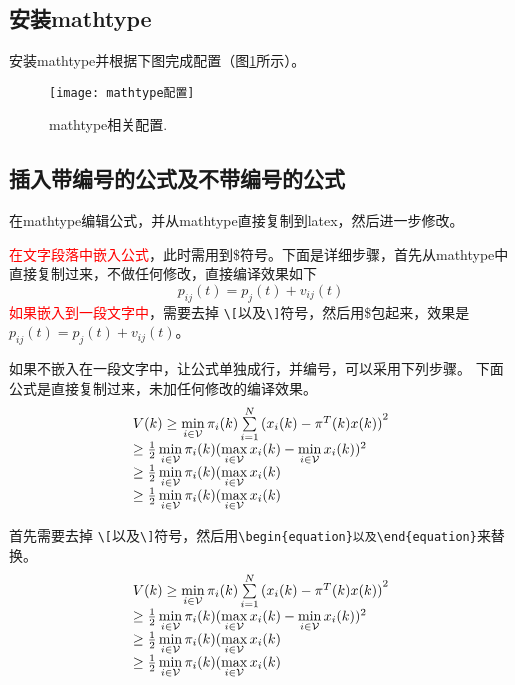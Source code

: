 \documentclass[master]{hdu-thesis}
\begin{document}
\subsection{安装mathtype}
安装mathtype并根据下图完成配置（图\ref{fig_mathtype1}所示）。
 \begin{figure}[!htb]
  \centering
  \texttt{[image: mathtype配置]}
  \caption{mathtype相关配置.}
  \label{fig_mathtype1}
\end{figure}

\subsection{插入带编号的公式及不带编号的公式}
在mathtype编辑公式，并从mathtype直接复制到latex，然后进一步修改。

\textcolor{red}{在文字段落中嵌入公式}，此时需用到\$符号。下面是详细步骤，首先从mathtype中直接复制过来，不做任何修改，直接编译效果如下
\[{p_{ij}}(t) = {p_j}(t) + {v_{ij}}(t)\]
\textcolor{red}{如果嵌入到一段文字中}，需要去掉 \verb|\[|以及\verb|\]|符号，然后用\$包起来，效果是${p_{ij}}(t) = {p_j}(t) + {v_{ij}}(t)$。

如果不嵌入在一段文字中，让公式单独成行，并编号，可以采用下列步骤。
下面公式是直接复制过来，未加任何修改的编译效果。
\[\begin{array}{l}
V(k) \ge \mathop {\min }\limits_{i \in {\cal V}} {\pi _i}(k)\sum\limits_{i = 1}^N {{{({x_i}(k) - {\pi ^T}(k)x(k))}^2}} \\
 \ge \frac{1}{2}\mathop {\min }\limits_{i \in {\cal V}} {\pi _i}(k){(\mathop {\max }\limits_{i \in {\cal V}} {x_i}(k) - \mathop {\min }\limits_{i \in {\cal V}} {x_i}(k))^2}\\
 \ge \frac{1}{2}\mathop {\min }\limits_{i \in {\cal V}} {\pi _i}(k)(\mathop {\max }\limits_{i \in {\cal V}} {x_i}(k)\\
 \ge \frac{1}{2}\mathop {\min }\limits_{i \in {\cal V}} {\pi _i}(k)(\mathop {\max }\limits_{i \in {\cal V}} {x_i}(k)
\end{array}\]

首先需要去掉 \verb|\[|以及\verb|\]|符号，然后用\verb+\begin{equation}以及\end{equation}+来替换。
\begin{equation}\label{system1}
  \begin{array}{l}
V(k) \ge \mathop {\min }\limits_{i \in {\cal V}} {\pi _i}(k)\sum\limits_{i = 1}^N {{{({x_i}(k) - {\pi ^T}(k)x(k))}^2}} \\
 \ge \frac{1}{2}\mathop {\min }\limits_{i \in {\cal V}} {\pi _i}(k){(\mathop {\max }\limits_{i \in {\cal V}} {x_i}(k) - \mathop {\min }\limits_{i \in {\cal V}} {x_i}(k))^2}\\
 \ge \frac{1}{2}\mathop {\min }\limits_{i \in {\cal V}} {\pi _i}(k)(\mathop {\max }\limits_{i \in {\cal V}} {x_i}(k)\\
 \ge \frac{1}{2}\mathop {\min }\limits_{i \in {\cal V}} {\pi _i}(k)(\mathop {\max }\limits_{i \in {\cal V}} {x_i}(k)
\end{array}
\end{equation}
\end{document}
